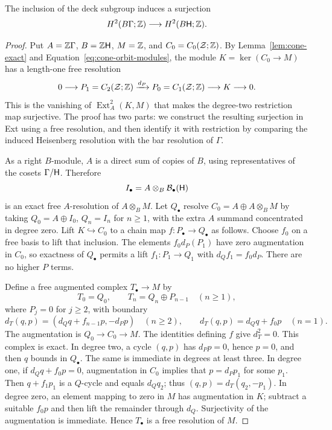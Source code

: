 \begin{lemma}
\label{lem:degree-two-restriction}
The inclusion of the deck subgroup induces a surjection
\begin{equation}
 H^2(B\Gamma;\mathbb Z)\longrightarrow H^2(B\mathsf H;\mathbb Z).
 \label{eq:degree-two-restriction}
\end{equation}
\end{lemma}

\begin{proof}
Put $A=\mathbb Z\Gamma$, $B=\mathbb Z\mathsf H$, $M=\mathbb Z$, and
$C_0=C_0(\mathcal Z;\mathbb Z)$.  By
Lemma~\ref{lem:cone-exact} and
Equation~\eqref{eq:cone-orbit-modules}, the module
$K=\ker(C_0\to M)$ has a length-one free resolution
\[
 0\longrightarrow P_1=C_2(\mathcal Z;\mathbb Z)
 \xrightarrow{d_P}P_0=C_1(\mathcal Z;\mathbb Z)
 \longrightarrow K\longrightarrow0.
\]
This is the vanishing of
$\operatorname{Ext}^2_A(K,M)$ that makes the degree-two restriction
map surjective.  The proof has two parts: we construct the resulting
surjection in Ext using a free resolution, and then identify it with
restriction by comparing the induced Heisenberg resolution with the bar
resolution of $\Gamma$.

As a right $B$-module, $A$ is a direct sum of copies of $B$, using
representatives of the cosets $\Gamma/\mathsf H$.  Therefore
\[
 I_\bullet=A\otimes_B\mathcal B_\bullet(\mathsf H)
\]
is an exact free $A$-resolution of $A\otimes_B M$.
Let $Q_\bullet$ resolve $C_0=A\oplus A\otimes_B M$ by taking
$Q_0=A\oplus I_0$, $Q_n=I_n$ for $n\geq1$, with the extra $A$
summand concentrated in degree zero.  Lift $K\hookrightarrow C_0$
to a chain map $f:P_\bullet\to Q_\bullet$ as follows.
Choose $f_0$ on a free basis to lift that inclusion.  The elements
$f_0d_P(P_1)$ have zero augmentation in $C_0$, so exactness of
$Q_\bullet$ permits a lift $f_1:P_1\to Q_1$ with
$d_Qf_1=f_0d_P$.  There are no higher $P$ terms.

Define a free augmented complex $T_\bullet\to M$ by
\[
 T_0=Q_0,\qquad T_n=Q_n\oplus P_{n-1}\quad(n\geq1),
\]
where $P_j=0$ for $j\geq2$, with boundary
\[
 d_T(q,p)=(d_Qq+f_{n-1}p,-d_Pp)\quad(n\geq2),\qquad
 d_T(q,p)=d_Qq+f_0p\quad(n=1).
\]
The augmentation is $Q_0\to C_0\to M$.
The identities defining $f$ give $d_T^2=0$.
This complex is exact.  In degree two, a cycle $(q,p)$ has
$d_Pp=0$, hence $p=0$, and then $q$ bounds in $Q_\bullet$.
The same is immediate in degrees at least three.  In degree one,
if $d_Qq+f_0p=0$, augmentation in $C_0$ implies that $p=d_Pp_1$
for some $p_1$.  Then $q+f_1p_1$ is a $Q$-cycle and equals
$d_Qq_2$; thus $(q,p)=d_T(q_2,-p_1)$.  In degree zero, an element
mapping to zero in $M$ has augmentation in $K$; subtract a suitable
$f_0p$ and then lift the remainder through $d_Q$.  Surjectivity of
the augmentation is immediate.  Hence $T_\bullet$ is a free
resolution of $M$.


\end{proof}
